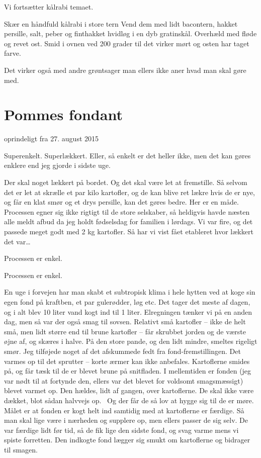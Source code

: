 \documentclass[
]{book}
\begin{document}
Vi fortsætter kålrabi temaet.

Skær en håndfuld kålrabi i store tern
Vend dem med lidt bacontern, hakket persille, salt, peber og finthakket hvidløg i en dyb gratinskål.
Overhæld med fløde og revet ost.
Smid i ovnen ved 200 grader til det virker mørt og osten har taget farve.

Det virker også med andre grøntsager man ellers ikke aner hvad man skal gøre med.

\hypertarget{pommes-fondant}{%
\section{Pommes fondant}\label{pommes-fondant}}

oprindeligt fra 27. august 2015

Superenkelt. Superlækkert. Eller, så enkelt er det heller ikke, men det kan gøres enklere end jeg gjorde i sidste uge.

Der skal noget lækkert på bordet. Og det skal være let at fremstille. Så selvom det er let at skrælle et par kilo kartofler, og de kan blive ret lækre hvis de er nye, og får en klat smør og et drys persille, kan det gøres bedre. Her er en måde. Processen egner sig ikke rigtigt til de store selskaber, så heldigvis havde næsten alle meldt afbud da jeg holdt fødselsdag for familien i lørdags. Vi var fire, og det passede meget godt med 2 kg kartofler. Så har vi vist fået etableret hvor lækkert det var\ldots{}

Processen er enkel.~

Processen er enkel.~

En uge i forvejen har man skabt et subtropisk klima i hele hytten ved at koge sin egen fond på kraftben, et par gulerødder, løg etc. Det tager det meste af dagen, og i alt blev 10 liter vand kogt ind til 1 liter. Elregningen tænker vi på en anden dag, men så var der også smag til sovsen.
Relativt små kartofler -- ikke de helt små, men lidt større end til brune kartofler -- får skrubbet jorden og de værste øjne af, og skæres i halve.
På den store pande, og den lidt mindre, smeltes rigeligt smør. Jeg tilføjede noget af det afskummede fedt fra fond-fremstillingen. Det varmes op til det sprutter -- korte ærmer kan ikke anbefales.
Kartoflerne smides på, og får tæsk til de er blevet brune på snitfladen.
I mellemtiden er fonden (jeg var nødt til at fortynde den, ellers var det blevet for voldsomt smagsmæssigt) blevet varmet op. Den hældes, lidt af gangen, over kartoflerne. De skal ikke være dækket, blot sådan halvvejs op.~
Og der får de så lov at hygge sig til de er møre. Målet er at fonden er kogt helt ind samtidig med at kartoflerne er færdige. Så man skal lige være i nærheden og supplere op, men ellers passer de sig selv. De var færdige lidt før tid, så de fik lige den sidste fond, og svag varme mens vi spiste forretten. Den indkogte fond lægger sig smukt om kartoflerne og bidrager til smagen.
\end{document}
